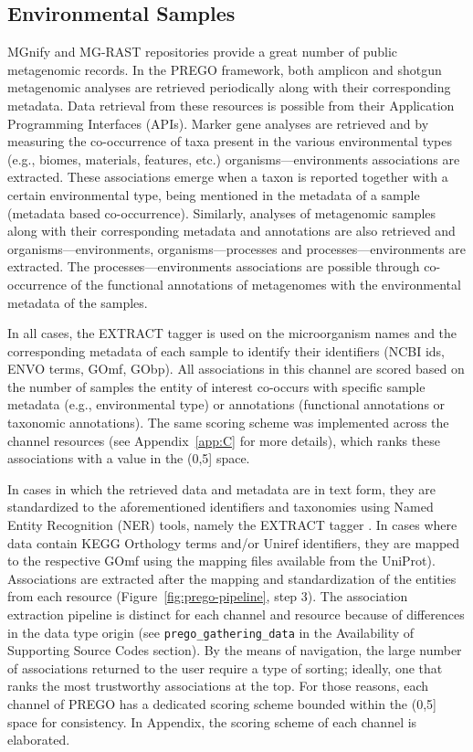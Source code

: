    \subsection{Environmental Samples}
   \label{subsec:prego-envsamples}

   MGnify \parencite{mitchell2020mgnify} and MG-RAST \parencite{wilke2015restful} repositories provide a great number of public metagenomic records. 
   In the PREGO framework, both amplicon and shotgun metagenomic analyses are retrieved periodically along with their corresponding metadata. 
   Data retrieval from these resources is possible from their Application Programming Interfaces (APIs). Marker gene analyses are retrieved and by measuring
   the co-occurrence of taxa present in the various environmental types (e.g., biomes, materials, features, etc.) organisms—environments associations are extracted. 
   These associations emerge when a taxon is reported together with a certain environmental type, being mentioned in the metadata of a sample (metadata based co-occurrence). 
   Similarly, analyses of metagenomic samples along with their corresponding metadata and annotations are also retrieved and organisms—environments, organisms—processes and processes—environments are extracted. 
   The processes—environments associations are possible through co-occurrence of the functional annotations of metagenomes with the environmental metadata of the samples.
   
   In all cases, the EXTRACT tagger is used on the microorganism names and the corresponding metadata of each sample to identify their identifiers (NCBI ids, ENVO terms, GOmf, GObp). 
   All associations in this channel are scored based on the number of samples the entity of interest co-occurs with specific sample metadata (e.g., environmental type) or annotations (functional annotations or taxonomic annotations). 
   The same scoring scheme was implemented across the channel resources (see Appendix~\ref{app:C} for more details), which ranks these associations with a value in the (0,5] space.
    
   In cases in which the retrieved data and metadata are in text form, they are standardized to the aforementioned identifiers and taxonomies using Named Entity Recognition (NER) tools, namely the EXTRACT tagger \parencite{pafilis2016extract, jensen2016one}. 
   In cases where data contain KEGG Orthology terms and/or Uniref identifiers, they are mapped to the respective GOmf using the mapping files available from the UniProt). 
   Associations are extracted after the mapping and standardization of the entities from each resource (Figure~\ref{fig:prego-pipeline}, step 3).
   The association extraction pipeline is distinct for each channel and resource because of differences in the data type origin (see \texttt{prego\_gathering\_data} in the Availability of Supporting Source Codes section). 
   By the means of navigation, the large number of associations returned to the user require a type of sorting; 
   ideally, one that ranks the most trustworthy associations at the top. 
   For those reasons, each channel of PREGO has a dedicated scoring scheme bounded within the (0,5] space for consistency. 
   In Appendix, the scoring scheme of each channel is elaborated.




